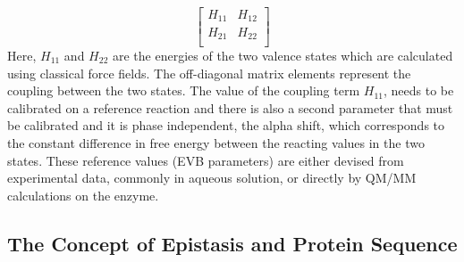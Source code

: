 \documentclass[journal=jacsat,manuscript=article]{achemso}
\begin{document}
{\[ 
  \left[ {\begin{array}{cc}
    H_{11} & H_{12} \\
    H_{21} & H_{22} \\
  \end{array} } \right]
\]
Here, $ H_{11} $ and $ H_{22} $ are the energies of the two valence states which are calculated using classical force fields. The off-diagonal matrix elements represent the coupling between the two states.  The value of the coupling term $ H_{11} $, needs to be calibrated on a reference reaction and there is also a second parameter that must be calibrated and it is phase independent, \cite{Oanca2023} the alpha shift, which corresponds to the constant difference in free energy between the reacting values in the two states. \cite{Oanca2023} These reference values (EVB parameters) are either devised from experimental data, commonly in aqueous solution, or directly by QM/MM calculations on the enzyme. 

\subsection{The Concept of Epistasis and Protein Sequence}

}
\end{document}

